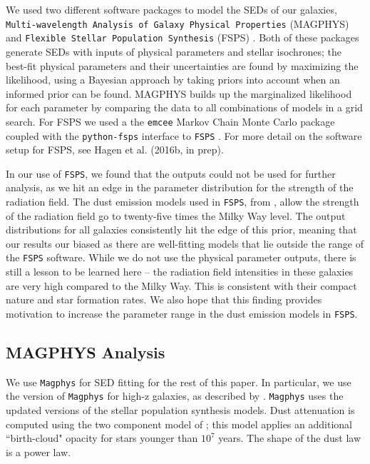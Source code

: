 \documentclass[preprint,natbib209]{aastex}
\begin{document}
We used two different software packages to model the SEDs of our galaxies, \texttt{Multi-wavelength Analysis of Galaxy Physical Properties} (MAGPHYS) \citep{dacunha08, dacunha15} and \texttt{Flexible Stellar Population Synthesis} (FSPS) \citep{conroy09, conroy10}. Both of these packages generate SEDs with inputs of physical parameters and stellar isochrones; the best-fit physical parameters and their uncertainties are found by maximizing the likelihood, using a Bayesian approach by taking priors into account when an informed prior can be found. MAGPHYS builds up the marginalized likelihood for each parameter by comparing the data to all combinations of models in a grid search. For FSPS we used a the \texttt{emcee} Markov Chain Monte Carlo package \citep{emcee} coupled with the \texttt{python-fsps} interface to \texttt{FSPS} \citep{python-fsps}. For more detail on the software setup for FSPS, see Hagen et al. (2016b, in prep). 

In our use of \texttt{FSPS}, we found that the outputs could not be used for further analysis, as we hit an edge in the parameter distribution for the strength of the radiation field. The dust emission models used in \texttt{FSPS}, from \cite{draine07}, allow the strength of the radiation field go to twenty-five times the Milky Way level. The output distributions for all galaxies consistently hit the edge of this prior, meaning that our results our biased as there are well-fitting models that lie outside the range of the \texttt{FSPS} software. While we do not use the physical parameter outputs, there is still a lesson to be learned here -- the radiation field intensities in these galaxies are very high compared to the Milky Way. This is consistent with their compact nature and star formation rates. We also hope that this finding provides motivation to increase the parameter range in the dust emission models in \texttt{FSPS}.

\subsection{MAGPHYS Analysis}

We use \texttt{Magphys} for SED fitting for the rest of this paper. In particular, we use the version of \texttt{Magphys} for high-z galaxies, as described by \cite{dacunha15}. \texttt{Magphys} uses the \cite{bruzual07} updated versions of the \cite{bruzual03} stellar population synthesis models. Dust attenuation is computed using the two component model of \cite{charlot00}; this model applies an additional ``birth-cloud" opacity for stars younger than $10^7$ years. The shape of the dust law is a power law. %
\end{document}
